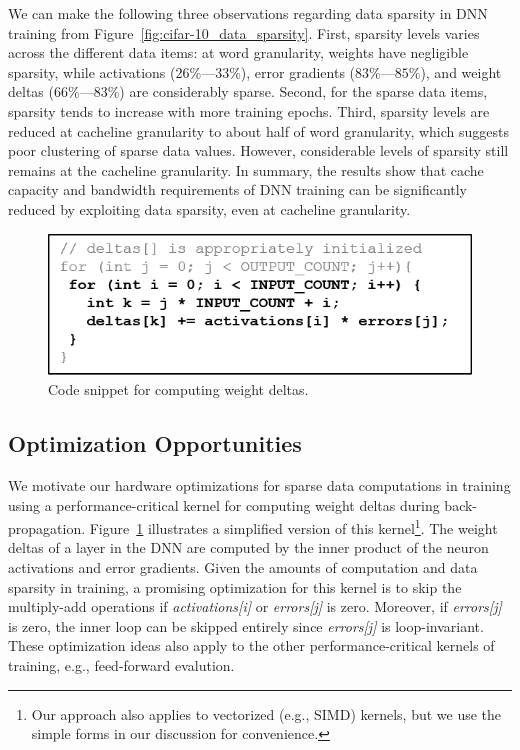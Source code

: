 We can make the following three observations regarding data sparsity in DNN training from Figure~\ref{fig:cifar-10_data_sparsity}.  First, sparsity levels varies across the different data items: at word granularity, weights have negligible sparsity, while activations ($26\%$---$33\%$), error gradients ($83\%$---$85\%$), and weight deltas ($66\%$---$83\%$) are considerably sparse.   Second, for the sparse data items, sparsity tends to increase with more training epochs.  Third, sparsity levels are reduced at cacheline granularity to about half of word granularity, which suggests poor clustering of sparse data values.  However, considerable levels of sparsity still remains at the cacheline granularity.  In summary, the results show that cache capacity and bandwidth requirements of DNN training can be significantly reduced by exploiting data  sparsity, even at cacheline granularity.

\begin{figure}
 \centering
 \includegraphics[width=.9\columnwidth]{Figures/deltas_source_code.png}
\caption{Code snippet for computing weight deltas.}
 \label{fig:deltas_source_code}
 \end{figure}

\subsection{Optimization Opportunities}
\label{subsec:sparse_code_oppor}
We motivate our hardware optimizations for sparse data computations in training using a performance-critical kernel for computing weight deltas during back-propagation.  Figure~\ref{fig:deltas_source_code} illustrates a simplified version of this kernel\footnote{Our approach also applies to vectorized (e.g., SIMD) kernels, but we use the simple forms in our discussion for convenience.}.   The weight deltas of a layer in the DNN are computed by the inner product of the neuron activations and error gradients.  Given the amounts of computation and data sparsity in training, a promising optimization for this kernel is to skip the multiply-add operations if \emph{activations[i]} or \emph{errors[j]} is zero.  Moreover,  if \emph{errors[j]} is zero, the inner loop can be skipped entirely since \emph{errors[j]} is loop-invariant. These optimization ideas also apply to the other performance-critical kernels of training, e.g., feed-forward evalution. 

